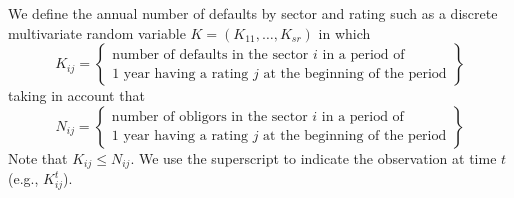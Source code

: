 \documentclass[11pt,fleqn]{book} %
\begin{document}
\begin{definition}
	We define the annual number of defaults by sector and rating such as a
	discrete multivariate random variable $K=(K_{11}, \dots, K_{sr})$ in which
	\begin{displaymath}
		K_{ij} = \left\{
		\begin{array}{c}
			\text{number of defaults in the sector $i$ in a period of} \\
			\text{1 year having a rating $j$ at the beginning of the period}
		\end{array}
		\right\}
	\end{displaymath}
	taking in account that
	\begin{displaymath}
		N_{ij} = \left\{
		\begin{array}{c}
			\text{number of obligors in the sector $i$ in a period of} \\
			\text{1 year having a rating $j$ at the beginning of the period}
		\end{array}
		\right\}
	\end{displaymath}
	Note that $K_{ij} \le N_{ij}$. We use the superscript to indicate 
	the observation at time $t$ (e.g., $K_{ij}^t$).
\end{definition}
\end{document}
